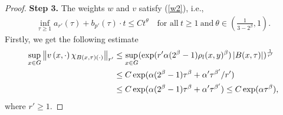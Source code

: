 \documentclass[10pt,a4paper]{amsart}
\begin{document}
\begin{proof}
		\textbf{Step 3.}  The weights $w$ and $v$ satisfy (\ref{w2}), i.e.,
		\begin{align*}
			\inf_{\tau\ge 1} a_{r'}(\tau ) +b_{p'}(\tau ) \cdot t\le Ct^{\theta}\quad \text{for~all} ~t\ge 1~\text{and}~\theta\in (\frac{1}{3-2^{\beta}},1).
		\end{align*}
		Firstly, we get the following estimate
		\begin{align}\label{sub2.5}
			\sup_{x\in G}\left \| v\left ( x,\cdot \right )\chi _{B\left ( x,\tau  \right )\left ( \cdot  \right )  }  \right \|_{r'} 
			&\le\sup_{x\in G}( \exp(r'\alpha (2^{\beta }-1) \rho_{l }(x,y)^{\beta})\left| B(x,\tau)\right|) ^\frac{1}{r'}\notag\\
			&\le C\exp(\alpha (2^{\beta }-1)\tau^\beta+\alpha'\tau^{\beta'}/r')\notag\\
			&\le C\exp(\alpha (2^{\beta }-1)\tau^\beta+\alpha'\tau^{\beta'})\le C\exp(\alpha \tau^\beta),
		\end{align}
		where $r'\ge 1$. 
		

\end{proof}
\end{document}
